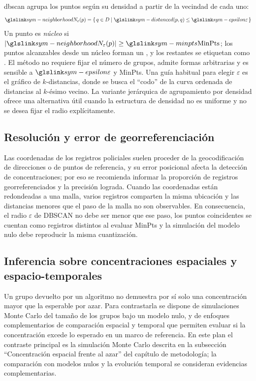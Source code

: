 \gls{dbscan} \citep{choi2021mdstdbscan,xie2021significantdbscan} agrupa los puntos según su densidad a partir de la vecindad de cada uno:
\begin{equation}
\symref{sym-neighborhood}{N_{\varepsilon}(p)} = \{\, q \in D \mid \symref{sym-distance}{d(p,q)} \leq \symref{sym-epsilon}{\varepsilon} \,\}
\label{eq:vecindad}
\eqtitulo{Vecindad $\varepsilon$ de un punto en DBSCAN.}
\end{equation}
Un punto es \emph{núcleo} si $|\symref{sym-neighborhood}{N_{\varepsilon}(p)}| \geq \symref{sym-minpts}{\mathrm{MinPts}}$; los puntos alcanzables desde un núcleo forman un , y los restantes se etiquetan como . El método no requiere fijar el número de grupos, admite formas arbitrarias y es sensible a $\symref{sym-epsilon}{\varepsilon}$ y MinPts. Una guía habitual para elegir $\varepsilon$ es el gráfico de $k$-distancias, donde se busca el ``codo'' de la curva ordenada de distancias al $k$-ésimo vecino. La variante jerárquica de agrupamiento por densidad ofrece una alternativa útil cuando la estructura de densidad no es uniforme y no se desea fijar el radio explícitamente.

\subsection{Resolución y error de georreferenciación}

Las coordenadas de los registros policiales suelen proceder de la geocodificación de direcciones o de puntos de referencia, y su error posicional afecta la detección de concentraciones; por eso se recomienda informar la proporción de registros georreferenciados y la precisión lograda. Cuando las coordenadas están redondeadas a una malla, varios registros comparten la misma ubicación y las distancias menores que el paso de la malla no son observables. En consecuencia, el radio $\varepsilon$ de DBSCAN no debe ser menor que ese paso, los puntos coincidentes se cuentan como registros distintos al evaluar MinPts y la simulación del modelo nulo debe reproducir la misma cuantización.

\subsection{Inferencia sobre concentraciones espaciales y espacio-temporales}

Un grupo devuelto por un algoritmo no demuestra por sí solo una concentración mayor que la esperable por azar. Para contrastarla se dispone de simulaciones Monte Carlo del tamaño de los grupos bajo un modelo nulo, y de enfoques complementarios de comparación espacial y temporal que permiten evaluar si la concentración excede lo esperado en un marco de referencia. En este plan el contraste principal es la simulación Monte Carlo descrita en la subsección ``Concentración espacial frente al azar'' del capítulo de metodología; la comparación con modelos nulos y la evolución temporal se consideran evidencias complementarias.

